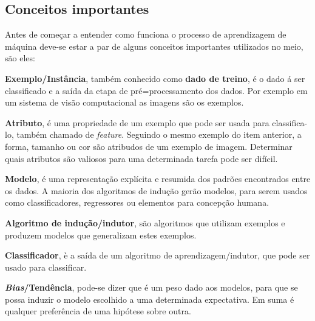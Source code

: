  \subsection{Conceitos importantes}
 \label{subsec:conceitos}
 Antes de começar a entender como funciona o processo de aprendizagem de máquina deve-se estar a par de alguns conceitos importantes 
 utilizados no meio, são eles:
  \begin{alineas}
  	\item \textbf{Exemplo/Instância}, também conhecido como \textbf{dado de treino}, é o dado á ser classificado e a saída da etapa de pré=processamento dos dados.
	Por exemplo em um sistema de visão computacional as imagens são os exemplos.
	\item \textbf{Atributo}, é uma propriedade de um exemplo que pode ser usada para classifica-lo, também chamado de \textit{feature}. Seguindo o mesmo exemplo do item anterior,
	a forma, tamanho ou cor são atribudos de um exemplo de imagem. Determinar quais atributos são valiosos para uma determinada tarefa pode 
	ser difícil.
	\item \textbf{Modelo}, é uma representação explícita e resumida dos padrões encontrados entre os dados. A maioria dos algoritmos de indução gerão modelos,
	para serem usados como classificadores, regressores ou elementos para concepção humana.
	\item \textbf{Algoritmo de indução/indutor}, são algoritmos que utilizam exemplos e produzem modelos que generalizam estes exemplos.
	\item \textbf{Classificador}, è a saída de um algoritmo de aprendizagem/indutor, que pode ser usado para classificar.
	\item \textbf{\textit{Bias}/Tendência}, pode-se dizer que é um peso dado aos modelos, para que se possa induzir o modelo escolhido
	 a uma determinada expectativa. Em suma é qualquer preferência de uma hipótese sobre outra.
  \end{alineas}  
